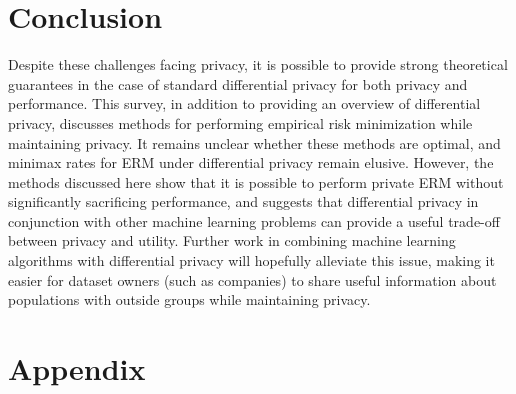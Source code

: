 \documentclass{article} %
\begin{document}
\section{Conclusion}
Despite these challenges facing privacy, it is possible to
provide strong theoretical guarantees in the case of standard differential
privacy for both privacy and performance. This survey, in addition to providing
an overview of differential privacy, discusses methods for performing empirical
risk minimization while maintaining privacy. It remains unclear whether these
methods are optimal, and minimax rates for ERM under differential privacy remain
elusive. However, the methods discussed here show that it is possible to perform
private ERM without significantly sacrificing performance, and suggests that
differential privacy in conjunction with other machine learning problems can
provide a useful trade-off between privacy and utility. Further work in
combining machine learning algorithms with differential privacy will hopefully
alleviate this issue, making it easier for dataset owners (such as companies) to
share useful information about populations with outside groups while maintaining
privacy.

{\small


}
\appendix
\section*{Appendix}
\end{document}
